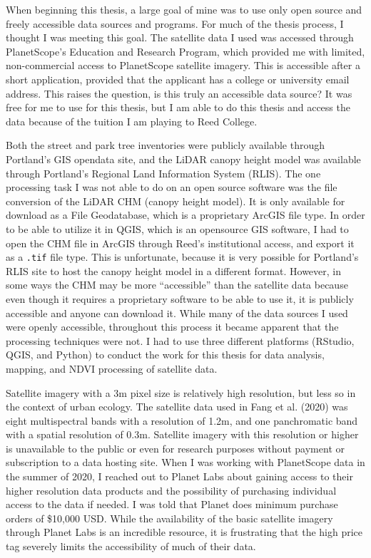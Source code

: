 \documentclass[12pt,twoside]{reedthesis}
\begin{document}
When beginning this thesis, a large goal of mine was to use only open
source and freely accessible data sources and programs. For much of the
thesis process, I thought I was meeting this goal. The satellite data I
used was accessed through PlanetScope's Education and Research Program,
which provided me with limited, non-commercial access to PlanetScope
satellite imagery. This is accessible after a short application,
provided that the applicant has a college or university email address.
This raises the question, is this truly an accessible data source? It
was free for me to use for this thesis, but I am able to do this thesis
and access the data because of the tuition I am playing to Reed College.

Both the street and park tree inventories were publicly available
through Portland's GIS opendata site, and the LiDAR canopy height model
was available through Portland's Regional Land Information System
(RLIS). The one processing task I was not able to do on an open source
software was the file conversion of the LiDAR CHM (canopy height model).
It is only available for download as a File Geodatabase, which is a
proprietary ArcGIS file type. In order to be able to utilize it in QGIS,
which is an opensource GIS software, I had to open the CHM file in
ArcGIS through Reed's institutional access, and export it as a \texttt{.tif}
file type. This is unfortunate, because it is very possible for
Portland's RLIS site to host the canopy height model in a different
format. However, in some ways the CHM may be more ``accessible'' than the
satellite data because even though it requires a proprietary software to
be able to use it, it is publicly accessible and anyone can download it.
While many of the data sources I used were openly accessible, throughout
this process it became apparent that the processing techniques were not.
I had to use three different platforms (RStudio, QGIS, and Python) to
conduct the work for this thesis for data analysis, mapping, and NDVI
processing of satellite data.

Satellite imagery with a 3m pixel size is relatively high resolution,
but less so in the context of urban ecology. The satellite data used in
Fang et al. (2020) was eight multispectral bands with a resolution of 1.2m, and
one panchromatic band with a spatial resolution of 0.3m. Satellite
imagery with this resolution or higher is unavailable to the public or
even for research purposes without payment or subscription to a data
hosting site. When I was working with PlanetScope data in the summer of
2020, I reached out to Planet Labs about gaining access to their higher
resolution data products and the possibility of purchasing individual
access to the data if needed. I was told that Planet does minimum
purchase orders of \$10,000 USD. While the availability of the basic
satellite imagery through Planet Labs is an incredible resource, it is
frustrating that the high price tag severely limits the accessibility of
much of their data.
\end{document}
